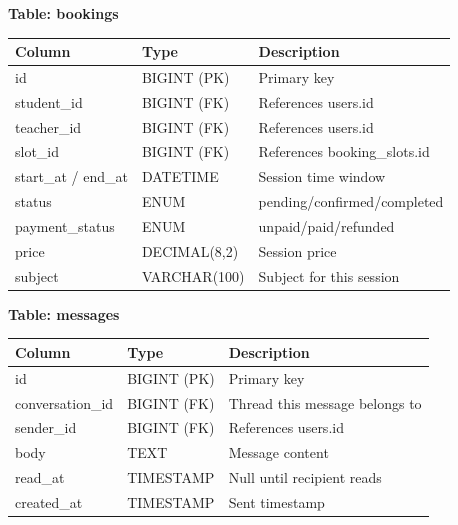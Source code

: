 \documentclass[12pt,a4paper]{report}
\begin{document}
\vspace{0.4cm}

\textbf{Table: bookings}\\[2pt]
\begin{tabular}{@{}L{3.2cm} L{3cm} L{7cm}@{}}
\toprule
{}\color{white}\textbf{Column} & \color{white}\textbf{Type} & \color{white}\textbf{Description} \\
\midrule
id & BIGINT (PK) & Primary key \\
student\_id & BIGINT (FK) & References users.id \\
teacher\_id & BIGINT (FK) & References users.id \\
slot\_id & BIGINT (FK) & References booking\_slots.id \\
start\_at / end\_at & DATETIME & Session time window \\
status & ENUM & pending/confirmed/completed \\
payment\_status & ENUM & unpaid/paid/refunded \\
price & DECIMAL(8,2) & Session price \\
subject & VARCHAR(100) & Subject for this session \\
\bottomrule
\end{tabular}

\vspace{0.4cm}

\textbf{Table: messages}\\[2pt]
\begin{tabular}{@{}L{3.2cm} L{3cm} L{7cm}@{}}
\toprule
{}\color{white}\textbf{Column} & \color{white}\textbf{Type} & \color{white}\textbf{Description} \\
\midrule
id & BIGINT (PK) & Primary key \\
conversation\_id & BIGINT (FK) & Thread this message belongs to \\
sender\_id & BIGINT (FK) & References users.id \\
body & TEXT & Message content \\
read\_at & TIMESTAMP & Null until recipient reads \\
created\_at & TIMESTAMP & Sent timestamp \\
\bottomrule
\end{tabular}
\end{document}
